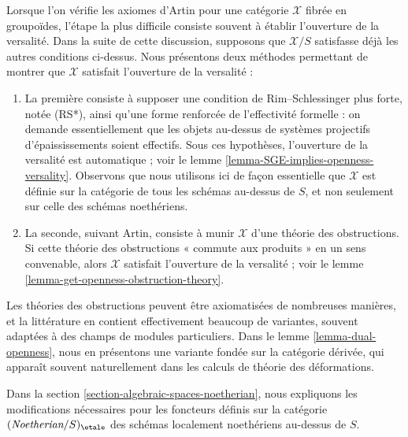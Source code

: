 \medskip\noindent
Lorsque l'on vérifie les axiomes d'Artin pour une catégorie $\mathcal{X}$
fibrée en groupoïdes, l'étape la plus difficile consiste souvent à établir
l'ouverture de la versalité. Dans la suite de cette discussion, supposons que
$\mathcal{X}/S$ satisfasse déjà les autres conditions ci-dessus. Nous
présentons deux méthodes permettant de montrer que $\mathcal{X}$ satisfait
l'ouverture de la versalité :
\begin{enumerate}
\item La première consiste à supposer une condition de Rim--Schlessinger plus
forte, notée (RS*), ainsi qu'une forme renforcée de l'effectivité formelle : on
demande essentiellement que les objets au-dessus de systèmes projectifs
d'épaississements soient effectifs. Sous ces hypothèses, l'ouverture de la
versalité est automatique ; voir le lemme
\ref{lemma-SGE-implies-openness-versality}. Observons que nous utilisons ici de
façon essentielle que $\mathcal{X}$ est définie sur la catégorie de tous les
schémas au-dessus de $S$, et non seulement sur celle des schémas noethériens.
\item La seconde, suivant Artin, consiste à munir $\mathcal{X}$ d'une théorie
des obstructions. Si cette théorie des obstructions « commute aux produits »
en un sens convenable, alors $\mathcal{X}$ satisfait l'ouverture de la
versalité ; voir le lemme \ref{lemma-get-openness-obstruction-theory}.
\end{enumerate}
Les théories des obstructions peuvent être axiomatisées de nombreuses manières,
et la littérature en contient effectivement beaucoup de variantes, souvent
adaptées à des champs de modules particuliers. Dans le lemme
\ref{lemma-dual-openness}, nous en présentons une variante fondée sur la
catégorie dérivée, qui apparaît souvent naturellement dans les calculs de
théorie des déformations.

\medskip\noindent
Dans la section \ref{section-algebraic-spaces-noetherian}, nous expliquons les
modifications nécessaires pour les foncteurs définis sur la catégorie
$(\textit{Noetherian}/S)_\etale$ des schémas localement noethériens au-dessus
de $S$.

